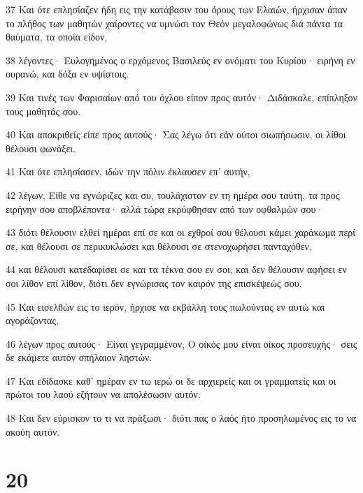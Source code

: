 \par 37 Και ότε επλησίαζεν ήδη εις την κατάβασιν του όρους των Ελαιών, ήρχισαν άπαν το πλήθος των μαθητών χαίροντες να υμνώσι τον Θεόν μεγαλοφώνως διά πάντα τα θαύματα, τα οποία είδον,
\par 38 λέγοντες· Ευλογημένος ο ερχόμενος Βασιλεύς εν ονόματι του Κυρίου· ειρήνη εν ουρανώ, και δόξα εν υψίστοις.
\par 39 Και τινές των Φαρισαίων από του όχλου είπον προς αυτόν· Διδάσκαλε, επίπληξον τους μαθητάς σου.
\par 40 Και αποκριθείς είπε προς αυτούς· Σας λέγω ότι εάν ούτοι σιωπήσωσιν, οι λίθοι θέλουσι φωνάξει.
\par 41 Και ότε επλησίασεν, ιδών την πόλιν έκλαυσεν επ' αυτήν,
\par 42 λέγων, Είθε να εγνώριζες και συ, τουλάχιστον εν τη ημέρα σου ταύτη, τα προς ειρήνην σου αποβλέποντα· αλλά τώρα εκρύφθησαν από των οφθαλμών σου·
\par 43 διότι θέλουσιν ελθεί ημέραι επί σε και οι εχθροί σου θέλουσι κάμει χαράκωμα περί σε, και θέλουσι σε περικυκλώσει και θέλουσι σε στενοχωρήσει πανταχόθεν,
\par 44 και θέλουσι κατεδαφίσει σε και τα τέκνα σου εν σοι, και δεν θέλουσιν αφήσει εν σοι λίθον επί λίθον, διότι δεν εγνώρισας τον καιρόν της επισκέψεώς σου.
\par 45 Και εισελθών εις το ιερόν, ήρχισε να εκβάλλη τους πωλούντας εν αυτώ και αγοράζοντας,
\par 46 λέγων προς αυτούς· Είναι γεγραμμένον, Ο οίκός μου είναι οίκος προσευχής· σεις δε εκάμετε αυτόν σπήλαιον ληστών.
\par 47 Και εδίδασκε καθ' ημέραν εν τω ιερώ οι δε αρχιερείς και οι γραμματείς και οι πρώτοι του λαού εζήτουν να απολέσωσιν αυτόν.
\par 48 Και δεν εύρισκον το τι να πράξωσι· διότι πας ο λαός ήτο προσηλωμένος εις το να ακούη αυτόν.

\chapter{20}

